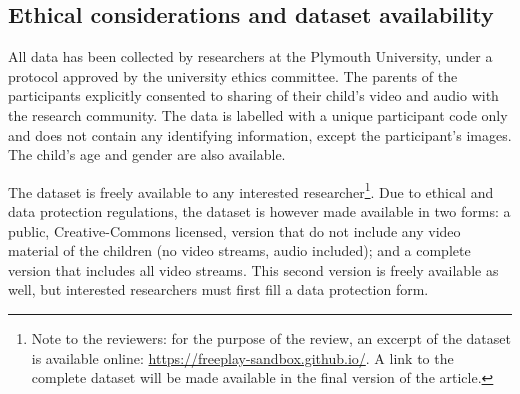 \documentclass{article}
\begin{document}
%
%


\subsection{Ethical considerations and dataset availability}
\label{availability}

All data has been collected by researchers at the Plymouth University, under a
protocol approved by the university ethics committee. The parents of the
participants explicitly consented to sharing of their child's video and audio
with the research community. The data is labelled with a unique participant code
only and does not contain any identifying information, except the participant's
images. The child's age and gender are also available.

The dataset is freely available to any interested researcher\footnote{Note to
the reviewers: for the purpose of the review, an excerpt of the dataset is
available online: \url{https://freeplay-sandbox.github.io/}. A link to the
complete dataset will be made available in the final version of the article.}.
Due to ethical and data protection regulations, the dataset is however made
available in two forms: a public, Creative-Commons licensed, version that do
not include any video material of the children (no video streams, audio
included); and a complete version that includes all video streams. This second
version is freely available as well, but interested researchers must first fill
a data protection form.
\end{document}
